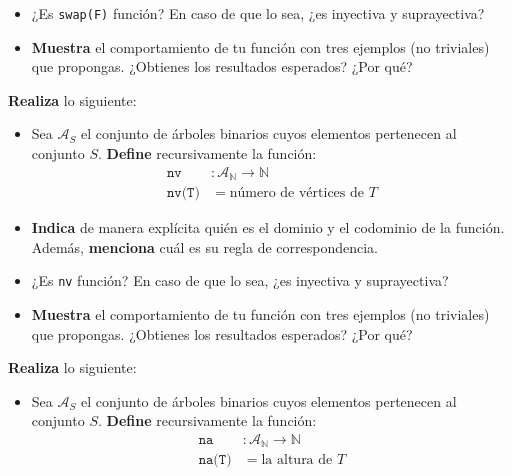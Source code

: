 \documentclass[oneside]{style}
\begin{document}
\begin{questions}[label=\protect\circled{\bfseries\arabic*}]
{\begin{itemize}
            \item ¿Es \texttt{swap(F)} función? En caso de que lo sea, ¿es 
            inyectiva y suprayectiva?

            \item \textbf{Muestra} el comportamiento de tu función con tres 
            ejemplos (no triviales) que propongas. ¿Obtienes los resultados 
            esperados? ¿Por qué?
        \end{itemize}
    }

    \question
    {
        \textbf{Realiza} lo siguiente:
        \begin{itemize}
            \item Sea $\mathcal{A}_S$ el conjunto de árboles binarios cuyos 
            elementos pertenecen al conjunto $S$. \textbf{Define} 
            recursivamente la función:
            \begin{align*}
                \texttt{nv}&: \mathcal{A}_\mathbb{N} \rightarrow 
                \mathbb{N} \\ 
                \texttt{nv(T)} &= \text{número de vértices de } T
            \end{align*} 

            \item \textbf{Indica} de manera explícita quién es el dominio y el 
            codominio de la función. Además, \textbf{menciona} cuál es su regla 
            de correspondencia.

            \item ¿Es \texttt{nv} función? En caso de que lo sea, ¿es inyectiva 
            y suprayectiva?

            \item \textbf{Muestra} el comportamiento de tu función con tres 
            ejemplos (no triviales) que propongas. ¿Obtienes los resultados 
            esperados? ¿Por qué?
        \end{itemize}
    }

    \question
    {
        \textbf{Realiza} lo siguiente:
        \begin{itemize}
            \item Sea $\mathcal{A}_S$ el conjunto de árboles binarios cuyos 
            elementos pertenecen al conjunto $S$. \textbf{Define} 
            recursivamente la función:
            \begin{align*}
                \texttt{na}&: \mathcal{A}_\mathbb{N} \rightarrow 
                \mathbb{N} \\ 
                \texttt{na(T)} &= \text{la altura de } T
            \end{align*} 


\end{itemize}}
\end{questions}
\end{document}
